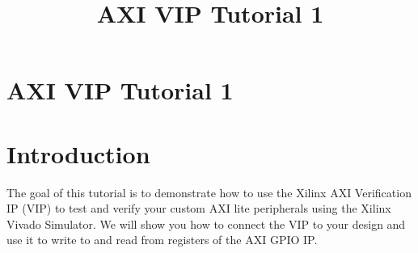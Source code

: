 \documentclass[12pt]{article}
\title{AXI VIP Tutorial 1}
\date{}
\begin{document}
\section*{AXI VIP Tutorial 1}
\section*{Introduction}
The goal of this tutorial is to demonstrate how to use the Xilinx AXI Verification IP (VIP) to test and verify your custom AXI lite peripherals using the Xilinx Vivado Simulator. We will show you how to connect the VIP to your design and use it to write to and read from registers of the AXI GPIO IP. 
\end{document}
